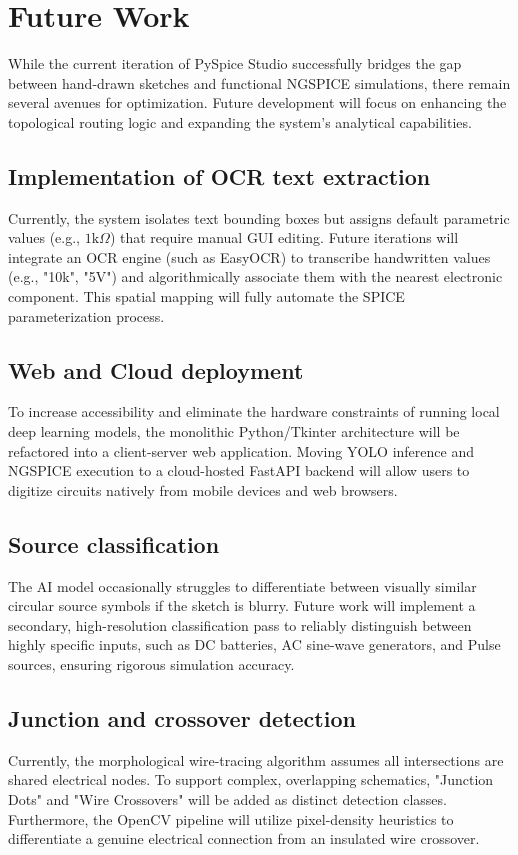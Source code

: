 \chapter{Future Work}

While the current iteration of PySpice Studio successfully bridges the gap between hand-drawn sketches and functional NGSPICE simulations, there remain several avenues for optimization. Future development will focus on enhancing the topological routing logic and expanding the system's analytical capabilities.

\section{Implementation of OCR text extraction}
Currently, the system isolates text bounding boxes but assigns default parametric values (e.g., $1\text{k}\Omega$) that require manual GUI editing. Future iterations will integrate an OCR engine (such as EasyOCR) to transcribe handwritten values (e.g., "10k", "5V") and algorithmically associate them with the nearest electronic component. This spatial mapping will fully automate the SPICE parameterization process.

\section{Web and Cloud deployment}
To increase accessibility and eliminate the hardware constraints of running local deep learning models, the monolithic Python/Tkinter architecture will be refactored into a client-server web application. Moving YOLO inference and NGSPICE execution to a cloud-hosted FastAPI backend will allow users to digitize circuits natively from mobile devices and web browsers.

\section{Source classification}
The AI model occasionally struggles to differentiate between visually similar circular source symbols if the sketch is blurry. Future work will implement a secondary, high-resolution classification pass to reliably distinguish between highly specific inputs, such as DC batteries, AC sine-wave generators, and Pulse sources, ensuring rigorous simulation accuracy.

\section{Junction and crossover detection}
Currently, the morphological wire-tracing algorithm assumes all intersections are shared electrical nodes. To support complex, overlapping schematics, "Junction Dots" and "Wire Crossovers" will be added as distinct detection classes. Furthermore, the OpenCV pipeline will utilize pixel-density heuristics to differentiate a genuine electrical connection from an insulated wire crossover.

